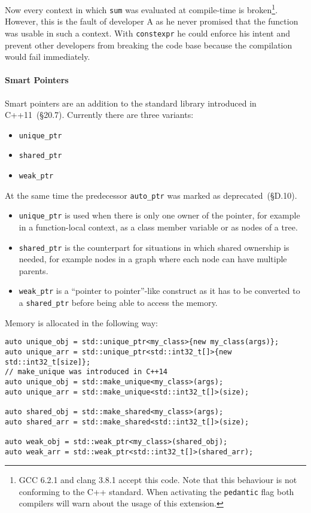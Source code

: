 \noindent Now every context in which \texttt{sum} was evaluated at compile-time is broken\footnote{GCC 6.2.1 and clang 3.8.1 accept this code. Note that this behaviour is not conforming to the C++ standard. When activating the \texttt{pedantic} flag both compilers will warn about the usage of this extension.}. However, this is the fault of developer A as he never promised that the function was usable in such a context. With \texttt{constexpr} he could enforce his intent and prevent other developers from breaking the code base because the compilation would fail immediately.

\paragraph{Smart Pointers}

Smart pointers are an addition to the standard library introduced in C++11~\cite{cpp11std}(§20.7). Currently there are three variants:
\begin{itemize}
\item \texttt{unique\_ptr}
\item \texttt{shared\_ptr}
\item \texttt{weak\_ptr}
\end{itemize}

At the same time the predecessor \texttt{auto\_ptr} was marked as deprecated~\cite{cpp11std}(§D.10).
\begin{itemize}
\item \texttt{unique\_ptr} is used when there is only one owner of the pointer, for example in a function-local context, as a class member variable or as nodes of a tree.

\item \texttt{shared\_ptr} is the counterpart for situations in which shared ownership is needed, for example nodes in a graph where each node can have multiple parents.

\item \texttt{weak\_ptr} is a ``pointer to pointer''-like construct as it has to be converted to a \texttt{shared\_ptr} before being able to access the memory.
\end{itemize}

Memory is allocated in the following way:
\begin{verbatim}
auto unique_obj = std::unique_ptr<my_class>{new my_class(args)};
auto unique_arr = std::unique_ptr<std::int32_t[]>{new std::int32_t[size]};
// make_unique was introduced in C++14
auto unique_obj = std::make_unique<my_class>(args);
auto unique_arr = std::make_unique<std::int32_t[]>(size);

auto shared_obj = std::make_shared<my_class>(args);
auto shared_arr = std::make_shared<std::int32_t[]>(size);

auto weak_obj = std::weak_ptr<my_class>(shared_obj);
auto weak_arr = std::weak_ptr<std::int32_t[]>(shared_arr);
\end{verbatim}

